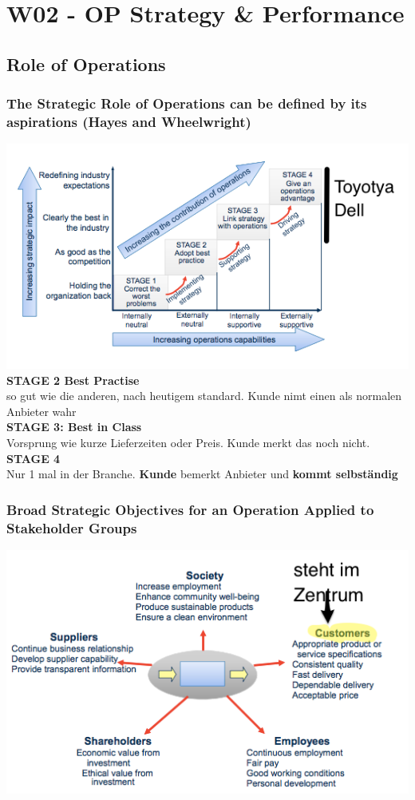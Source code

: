 \section{W02 - OP Strategy \& Performance}
 
\subsection{Role of Operations}
\subsubsection{The Strategic Role of Operations can be defined by its aspirations (Hayes and Wheelwright)}
\includegraphics[width=1\textwidth]{W02/role_of_operations}
\textbf{STAGE 2 Best Practise}\\ so gut wie die anderen, nach heutigem standard. Kunde nimt einen als normalen Anbieter wahr\\
\textbf{STAGE 3: Best in Class}\\ Vorsprung wie kurze Lieferzeiten oder Preis. Kunde merkt das noch nicht.\\
\textbf{STAGE 4}\\ Nur 1 mal in der Branche. \textbf{Kunde} bemerkt Anbieter und \textbf{kommt selbst\"andig}
\subsubsection{Broad Strategic Objectives for an Operation Applied to Stakeholder Groups}
\includegraphics[width=1\textwidth]{W02/stakeholder_group}
